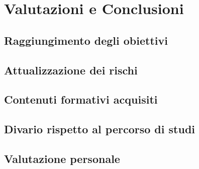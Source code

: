 \chapter{Valutazioni e Conclusioni}
\label{cap:conclusioni}
\section{Raggiungimento degli obiettivi}

\section{Attualizzazione dei rischi}

\section{Contenuti formativi acquisiti}
\section{Divario rispetto al percorso di studi}

\section{Valutazione personale}

\newpage
\pagestyle{empty}
\null %
\newpage